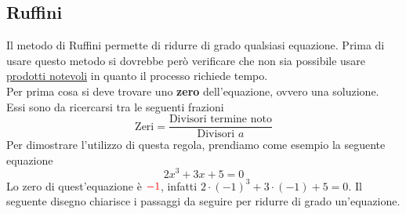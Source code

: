 \subsection{Ruffini}\label{ruffini}
Il metodo di Ruffini permette di ridurre di grado qualsiasi equazione. Prima di usare questo metodo si
dovrebbe però verificare che non sia possibile usare \hyperref[subsec:gen:prodnot]{prodotti notevoli}
in quanto il processo richiede tempo.\\
Per prima cosa si deve trovare uno \textbf{zero} dell'equazione, ovvero una soluzione. Essi sono
da ricercarsi tra le seguenti frazioni
\begin{equation*}
  \text{Zeri} = \frac{\text{Divisori termine noto}}{\text{Divisori $a$}}
\end{equation*}
Per dimostrare l'utilizzo di questa regola, prendiamo come esempio la seguente equazione
\begin{equation}\label{eq:ruffini}
  2x^3 + 3x + 5 = 0
\end{equation}
Lo zero di quest'equazione è $\mathcolor{red}{-1}$, infatti $2\cdot(-1)^3 + 3\cdot(-1) + 5 = 0$. Il 
seguente disegno chiarisce i passaggi da seguire per ridurre di grado un'equazione.
\begin{center}
\end{center}

